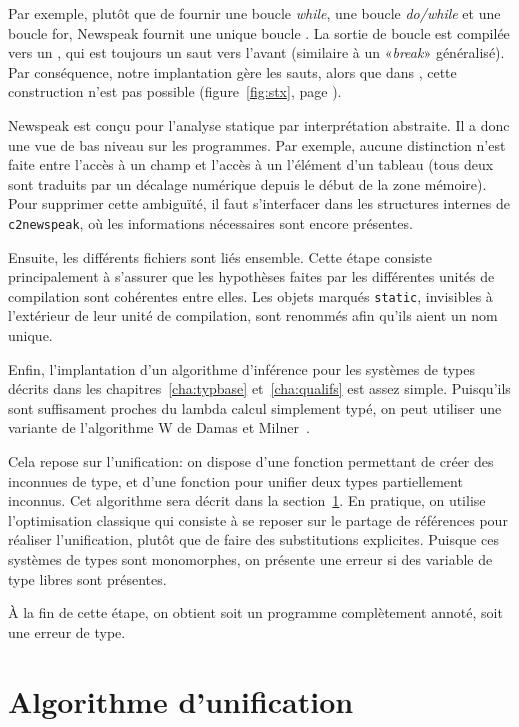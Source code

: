 Par exemple, plutôt que de fournir une boucle \emph{while}, une boucle
\emph{do/while} et une boucle for, Newspeak fournit une unique boucle
\npkWhile{}. La sortie de boucle est compilée vers un \npkGoto{}\cite{goto}, qui
est toujours un saut vers l'avant (similaire à un «\emph{break}» généralisé).
Par conséquence, notre implantation gère les sauts, alors que dans \langname,
cette construction n'est pas possible (figure~\ref{fig:stx}, page
\pageref{fig:stx}).

Newspeak est conçu pour l'analyse statique par interprétation abstraite. Il a
donc une vue de bas niveau sur les programmes. Par exemple, aucune distinction
n'est faite entre l'accès à un champ et l'accès à un l'élément d'un tableau
(tous deux sont traduits par un décalage numérique depuis le début de la zone
mémoire). Pour supprimer cette ambiguïté, il faut s'interfacer dans les
structures internes de \texttt{c2newspeak}, où les informations nécessaires sont
encore présentes.

Ensuite, les différents fichiers sont liés ensemble. Cette étape consiste
principalement à s'assurer que les hypothèses faites par les différentes unités
de compilation sont cohérentes entre elles. Les objets marqués \texttt{static},
invisibles à l'extérieur de leur unité de compilation, sont renommés afin qu'ils
aient un nom unique.

Enfin, l'implantation d'un algorithme d'inférence pour les systèmes de types
décrits dans les chapitres~\ref{cha:typbase} et~\ref{cha:qualifs} est assez
simple. Puisqu'ils sont suffisament proches du lambda calcul simplement typé, on
peut utiliser une variante de l'algorithme W de Damas et
Milner~\cite{DamasMilner}.

Cela repose sur l'unification: on dispose d'une fonction permettant de créer des
inconnues de type, et d'une fonction pour unifier deux types partiellement
inconnus. Cet algorithme sera décrit dans la section~\ref{sec:unif}. En
pratique, on utilise l'optimisation classique qui consiste à se
reposer sur le partage de références pour réaliser l'unification, plutôt que de
faire des substitutions explicites. Puisque ces systèmes de types sont
monomorphes, on présente une erreur si des variable de type libres sont
présentes.

À la fin de cette étape, on obtient soit un programme complètement annoté, soit
une erreur de type.

\section{Algorithme d'unification}
\label{sec:unif}

